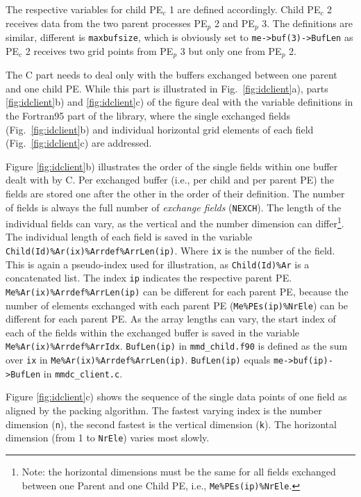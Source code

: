 \documentclass[twoside]{article}
\begin{document}
The respective variables for child PE$_c$ 1 are defined accordingly.
Child PE$_c$ 2 receives data from the two parent processes PE$_p$ 2 and PE$_p$ 3.
The definitions are similar, different is \verb|maxbufsize|, which is
obviously set to \verb|me->buf(3)->BufLen| as PE$_c$ 2 receives two grid points
from PE$_p$ 3 but only one from PE$_p$ 2.

The C part needs to deal only with the buffers exchanged between
one parent and one child PE. While this part is illustrated in Fig.\ 
\ref{fig:idclient}a), parts  \ref{fig:idclient}b) and  \ref{fig:idclient}c) of
 the figure deal with the variable
definitions in the Fortran95 part of the library, where the single exchanged 
fields (Fig.\ \ref{fig:idclient}b) and individual horizontal grid elements
 of each field (Fig.\ \ref{fig:idclient}c) are addressed.

 Figure \ref{fig:idclient}b) illustrates the order of the single fields within
one buffer dealt with by C. Per exchanged buffer (i.e., per child and
per parent PE) the fields are stored one after the other in the order
of their definition. The number of fields is always the full number of {\it 
exchange fields} (\verb|NEXCH|). 
The length of the individual fields can vary, as the vertical
and the number dimension can differ\footnote{Note: the horizontal dimensions 
must be the same for all fields exchanged between one Parent and one Child PE,
 i.e., {\tt Me\%PEs(ip)\%NrEle}.}. 
The individual length of each field is saved in the 
variable \verb|Child(Id)%Ar(ix)%Arrdef%ArrLen(ip)|. Where \verb|ix| is the number of
the field. This is again a pseudo-index used for illustration, as \verb|Child(Id)%Ar|
is a concatenated list. The index \verb|ip| indicates the respective parent PE.
\verb|Me%Ar(ix)%Arrdef%ArrLen(ip)| can be different for each parent PE, because
the number of elements exchanged with each parent PE (\verb|Me%PEs(ip)%NrEle|) 
can be different for each parent PE.
As the array lengths can vary, the start index of each of the fields within
the exchanged buffer is saved in the variable \verb|Me%Ar(ix)%Arrdef%ArrIdx|.
 \verb|BufLen(ip)| in \verb|mmd_child.f90| is  defined as the sum
over \verb|ix| in \verb|Me%Ar(ix)%Arrdef%ArrLen(ip)|.  \verb|BufLen(ip)| equals
\verb|me->buf(ip)->BufLen| in \verb|mmdc_client.c|.

 Figure \ref{fig:idclient}c) shows the sequence of the single data points of
one field as aligned by the packing algorithm.
 The fastest varying index is the number dimension (\verb|n|), 
the second fastest is the vertical dimension (\verb|k|). The horizontal 
dimension (from 1 to \verb|NrEle|) varies most slowly.
\end{document}
